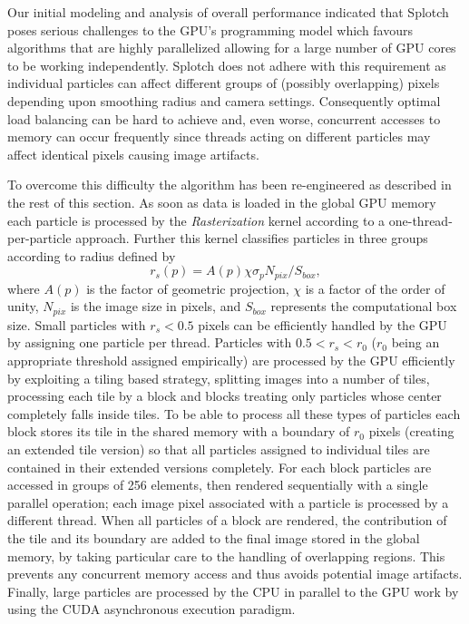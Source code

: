 Our initial modeling and analysis of overall performance indicated that Splotch poses serious challenges to the GPU's programming model which favours algorithms that are highly parallelized allowing for a large number of GPU cores to be working independently. Splotch does not adhere with this requirement as individual particles can affect different groups of (possibly overlapping) pixels depending upon smoothing radius and camera settings. Consequently optimal load balancing can be hard to achieve and, even worse, concurrent accesses to memory can occur frequently since threads acting on different particles may affect identical pixels causing image artifacts.

To overcome this difficulty the algorithm has been re-engineered as described in the rest of this section. As soon as data is loaded in the global GPU memory each particle is processed by the {\it Rasterization} kernel according to a one-thread-per-particle approach. Further this kernel classifies particles in three groups according to radius defined by 
\begin{equation}\label{rad2}{r_s(p)}=A(p)\chi \sigma_p N_{pix}/ S_{box},
\end{equation}
where $A(p)$ is the factor of geometric projection, $\chi$ is a factor of the order of unity, $N_{pix}$ is the image size in pixels, and $S_{box}$ represents the computational box size. Small particles with $r_s < 0.5$ pixels can be efficiently handled by the GPU by assigning one particle per thread. Particles with $0.5<r_s<r_0$ ($r_0$ being an appropriate threshold assigned empirically) are processed by the GPU efficiently by exploiting a tiling based strategy, splitting images into a number of tiles, processing each tile by a block and blocks treating only particles whose center completely falls inside tiles. To be able to process all these types of particles each block stores its tile in the shared memory with a boundary of $r_0$ pixels (creating an extended tile version) so that all particles assigned to individual tiles are contained in their extended versions completely. For each block particles are accessed in groups of 256 elements, then rendered sequentially with a single parallel operation; each image pixel associated with a particle is processed by a different thread. When all particles of a block are rendered, the contribution of the tile and its boundary are added to the final image stored in the global memory, by taking particular care to the handling of overlapping regions. This prevents any concurrent memory access and thus avoids potential image artifacts. Finally, large particles are processed by the CPU in parallel to the GPU work by using the CUDA asynchronous execution paradigm.

